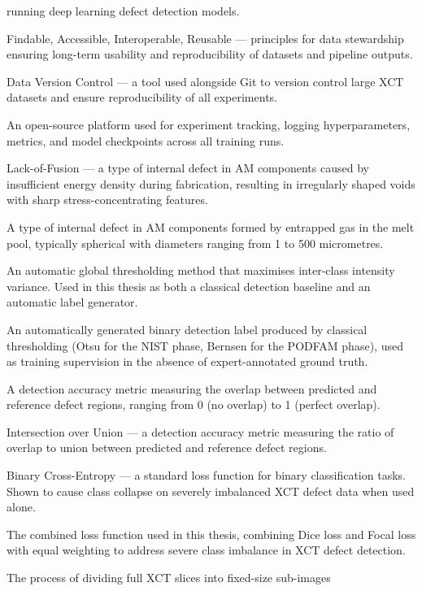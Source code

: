 \begin{description}[leftmargin=2.6cm, style=nextline]
  running deep learning defect detection models.
\item[FAIR] Findable, Accessible, Interoperable, Reusable --- principles for data stewardship ensuring
  long-term usability and reproducibility of datasets and pipeline outputs.
\item[DVC] Data Version Control --- a tool used alongside Git to version control large XCT datasets
  and ensure reproducibility of all experiments.
\item[MLflow] An open-source platform used for experiment tracking, logging hyperparameters, metrics,
  and model checkpoints across all training runs.
\item[LoF] Lack-of-Fusion --- a type of internal defect in AM components caused by insufficient
  energy density during fabrication, resulting in irregularly shaped voids with sharp
  stress-concentrating features.
\item[Gas Porosity] A type of internal defect in AM components formed by entrapped gas in the melt
  pool, typically spherical with diameters ranging from 1 to 500 micrometres.
\item[Otsu Threshold] An automatic global thresholding method that maximises inter-class intensity
  variance. Used in this thesis as both a classical detection baseline and an automatic label
  generator.
\item[Pseudo-Label] An automatically generated binary detection label produced by classical
  thresholding (Otsu for the NIST phase, Bernsen for the PODFAM phase), used as training supervision
  in the absence of expert-annotated ground truth.
\item[Dice Coefficient] A detection accuracy metric measuring the overlap between predicted and
  reference defect regions, ranging from 0 (no overlap) to 1 (perfect overlap).
\item[IoU] Intersection over Union --- a detection accuracy metric measuring the ratio of overlap to
  union between predicted and reference defect regions.
\item[BCE] Binary Cross-Entropy --- a standard loss function for binary classification tasks. Shown
  to cause class collapse on severely imbalanced XCT defect data when used alone.
\item[Dice-Focal Loss] The combined loss function used in this thesis, combining Dice loss and Focal
  loss with equal weighting to address severe class imbalance in XCT defect detection.
\item[Patch Extraction] The process of dividing full XCT slices into fixed-size sub-images

\end{description}
